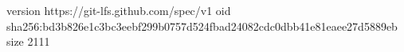 version https://git-lfs.github.com/spec/v1
oid sha256:bd3b826e1c3bc3eebf299b0757d524fbad24082cdc0dbb41e81eaee27d5889eb
size 2111
